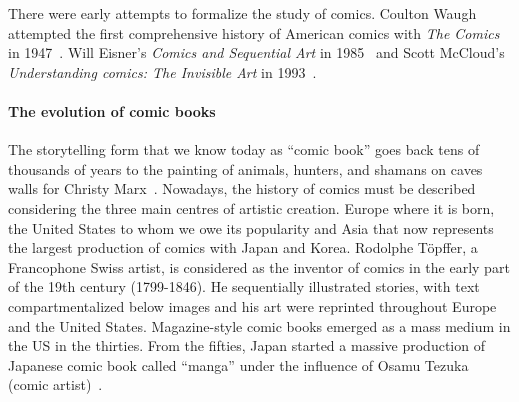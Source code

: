 There were early attempts to formalize the study of comics. 
Coulton Waugh attempted the first comprehensive history of American comics with \emph{The Comics} in 1947~\cite{Coulton1947Comics}.
Will Eisner's \emph{Comics and Sequential Art} in 1985~\cite{Eisner1985Comics} and Scott McCloud's \emph{Understanding comics: The Invisible Art} in 1993~\cite{mccloud1994understanding}.









\paragraph{The evolution of comic books}

The storytelling form that we know today as ``comic book'' goes back tens of thousands of years to the painting of animals, hunters, and shamans on caves walls for Christy Marx~\cite{Marx2007Writing}.
Nowadays, the history of comics must be described considering the three main centres of artistic creation.
Europe where it is born, the United States to whom we owe its popularity and Asia that now represents the largest production of comics with Japan and Korea.
Rodolphe Töpffer, a Francophone Swiss artist, is considered as the inventor of comics in the early part of the 19th century (1799-1846).
He sequentially illustrated stories, with text compartmentalized below images and his art were reprinted throughout Europe and the United States.
Magazine-style comic books emerged as a mass medium in the US in the thirties.
From the fifties, Japan started a massive production of Japanese comic book called ``manga'' under the influence of Osamu Tezuka (comic artist)~\cite{Chrysoline2014}.

